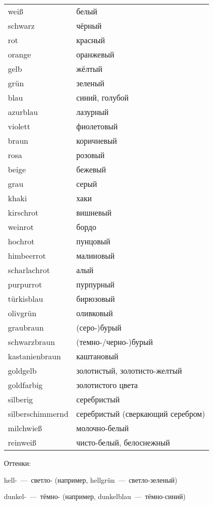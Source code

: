 

\begin{longtable}{|ll|}
\hline
\hline\endhead
\hline\endfoot
wei\ss & белый \\
schwarz & чёрный \\
rot & красный \\
orange & оранжевый \\
gelb & жёлтый \\
gr\"un & зеленый \\
blau & синий, голубой \\
azurblau & лазурный \\
violett & фиолетовый \\
braun & коричневый \\
rosa & розовый \\
beige & бежевый \\
grau & серый \\
khaki & хаки \\
kirschrot & вишневый \\
weinrot & бордо \\
hochrot & пунцовый \\
himbeerrot & малиновый \\
scharlachrot & алый \\
purpurrot & пурпурный \\
t\"urkisblau & бирюзовый \\
olivgr\"un & оливковый \\
graubraun & (серо-)бурый \\
schwarzbraun & (темно-/черно-)бурый \\
kastanienbraun & каштановый \\
goldgelb & золотистый, золотисто-желтый \\
goldfarbig & золотистого цвета \\
silberig & серебристый \\
silberschimmernd & серебристый (сверкающий серебром) \\
milchwie\ss & молочно-белый \\
reinwei\ss & чисто-белый, белоснежный \\
\hline
\end{longtable}

Оттенки:

hell-~---~светло- (например, hellgr\"un~---~светло-зеленый)

dunkel-~---~тёмно- (например, dunkelblau~---~тёмно-синий)
